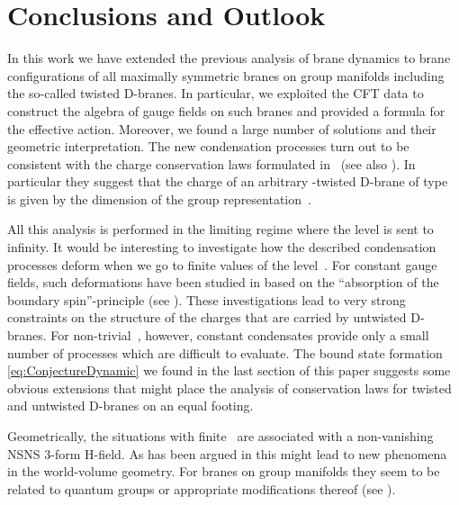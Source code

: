 \documentclass[12pt,a4paper]{article}
\providecommand{\mc}{\mathcal} %
\def\iG{G^\omega} %
\def\bL{\mc{B}} %
\def\reps{P^+} %
\def\treps{\bL^\omega} %
\begin{document}
\section{Conclusions and Outlook}

In this work we have extended the previous analysis of brane 
dynamics \cite{Alekseev:1999bs,Alekseev:2000fd,Alekseev:2000wg} 
to brane configurations of all maximally symmetric branes on 
group manifolds including the so-called twisted D-branes. In 
particular, we exploited the CFT data to construct the algebra 
of gauge fields on such branes and provided a formula for the 
effective action. Moreover, we found a large number of solutions 
and their geometric interpretation. The new condensation processes 
turn out to be consistent with the charge conservation laws 
formulated in~\cite{Fredenhagen:2000ei} (see also 
\cite{Maldacena:2001xj}). In particular they suggest that the charge 
of an arbitrary \myHighlight{$\omega$}\coordHE{}-twisted D-brane of type~\myHighlight{$a\in\reps_{\iG}
\cong\treps$}\coordHE{} is given by the dimension of the group 
representation~\coordHE{}.
\medskip 

All this analysis is performed in the limiting regime where 
the level \coordHE{} is sent to infinity. It would be interesting to 
investigate how the described condensation processes deform 
when we go to finite values of the level~\coordHE{}. For constant
gauge fields, such deformations have been studied in 
\cite{Alekseev:2000jx,Fredenhagen:2000ei} based on the 
``absorption of the boundary spin''-principle (see 
\cite{Affleck:1991by,Affleck:1991iv}). These investigations 
lead to very strong constraints on the structure of the charges 
that are carried by untwisted D-branes. For non-trivial~\myHighlight{$\omega$}\coordHE{}, 
however, constant condensates provide only a small number of 
processes which are difficult to evaluate. The bound state 
formation \eqref{eq:ConjectureDynamic} we found in the last 
section of this paper suggests some obvious extensions that 
might place the analysis of conservation laws for twisted and 
untwisted D-branes on an equal footing. 

Geometrically, the situations with finite~\coordHE{} are associated 
with a non-vanishing NSNS 3-form H-field. As has been argued 
in \cite{Alekseev:1999bs,Cornalba:2001sm,Hayasaka:2001an} 
this might lead to new phenomena in the world-volume geometry.
For branes on group manifolds they seem to be related to 
quantum groups or appropriate modifications thereof 
(see \cite{Alekseev:1999bs,Alekseev:1995rn,Pawelczyk:2002kd}). 
\medskip
\end{document}
